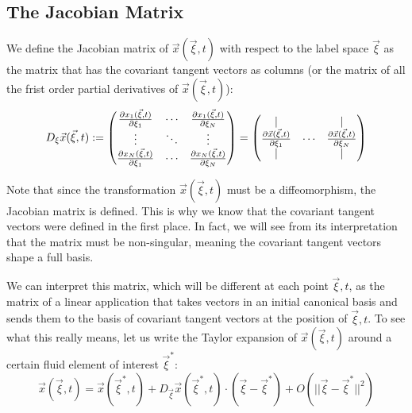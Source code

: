 \documentclass[11pt, a4paper]{article} %
\begin{document}
\subsection*{The Jacobian Matrix\vspace{-0.2cm}}
We define the Jacobian matrix of $\vec{x}(\vec{\xi},t)$ with respect to the label space $\vec{\xi}$ as the matrix that has the covariant tangent vectors as columns (or the matrix of all the frist order partial derivatives of $\vec{x}(\vec{\xi},t)$):
\begin{equation}
D_\xi\vec{x}(\vec{\xi},t):=\begin{pmatrix}
\pdv{x_1(\vec{\xi},t)}{\xi_1} & \cdots & \pdv{x_1(\vec{\xi},t)}{\xi_N}\\
\vdots&\ddots&\vdots \\
\pdv{x_N(\vec{\xi},t)}{\xi_1} & \cdots & \pdv{x_N(\vec{\xi},t)}{\xi_N}
\end{pmatrix}=\begin{pmatrix}
|& &|\\
\pdv{\vec{x}(\vec{\xi},t)}{\xi_1} & \cdots & \pdv{\vec{x}(\vec{\xi},t)}{\xi_N}\\
|& &|
\end{pmatrix}
\end{equation}

Note that since the transformation $\vec{x}(\vec{\xi},t)$ must be a diffeomorphism, the Jacobian matrix is defined. This is why we know that the covariant tangent vectors were defined in the first place. In fact, we will see from its interpretation that the matrix must be non-singular, meaning the covariant tangent vectors shape a full basis.

We can interpret this matrix, which will be different at each point $\vec{\xi},t$, as the matrix of a linear application that takes vectors in an initial canonical basis and sends them to the basis of covariant tangent vectors at the position of $\vec{\xi},t$. To see what this really means, let us write the Taylor expansion of $\vec{x}(\vec{\xi},t)$ around a certain fluid element of interest $\vec{\xi}^*$:
\begin{equation}
\vec{x}(\vec{\xi},t)=\vec{x}(\vec{\xi}^*,t)+D_{\vec{\xi}}\vec{x}(\vec{\xi}^*,t)\cdot (\vec{\xi}-\vec{\xi}^*)+O(||\vec{\xi}-\vec{\xi}^*||^2)
\end{equation}
\end{document}
